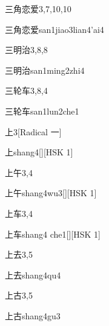 \begin{entry}{三角恋爱}{3,7,10,10}
  \begin{phonetics}{三角恋爱}{san1jiao3lian4'ai4}
  \end{phonetics}
\end{entry}

\begin{entry}{三明治}{3,8,8}
  \begin{phonetics}{三明治}{san1ming2zhi4}
  \end{phonetics}
\end{entry}

\begin{entry}{三轮车}{3,8,4}
  \begin{phonetics}{三轮车}{san1lun2che1}
  \end{phonetics}
\end{entry}

\begin{entry}{上}{3}[Radical 一]
  \begin{phonetics}{上}{shang4}[][HSK 1]
  \end{phonetics}
\end{entry}

\begin{entry}{上午}{3,4}
  \begin{phonetics}{上午}{shang4wu3}[][HSK 1]
  \end{phonetics}
\end{entry}

\begin{entry}{上车}{3,4}
  \begin{phonetics}{上车}{shang4 che1}[][HSK 1]
  \end{phonetics}
\end{entry}

\begin{entry}{上去}{3,5}
  \begin{phonetics}{上去}{shang4qu4}
  \end{phonetics}
\end{entry}

\begin{entry}{上古}{3,5}
  \begin{phonetics}{上古}{shang4gu3}
  \end{phonetics}
\end{entry}

